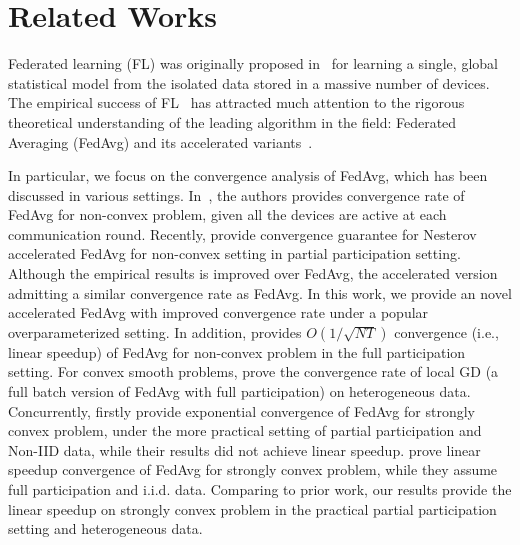 
\section{Related Works}

Federated learning (FL) was originally proposed
in~\cite{mcmahan2016communication} for learning a single, global statistical
model from the isolated data stored in a massive number of devices.  The
empirical success of FL~\cite{chen2018federated,47586} has attracted much attention to the rigorous theoretical understanding of the leading algorithm in the field: Federated Averaging (FedAvg) and its accelerated variants~\cite{liu2019accelerating,haddadpour2019convergence,khaled2019first,li2019convergence,huo2020faster,yu2019linear,yu2019parallel}.

In particular, we focus on the convergence analysis of FedAvg, which
has been discussed in various settings. 
In~\cite{yu2019parallel,wang2019adaptive}, the authors provides convergence
rate of FedAvg for non-convex problem, given all the devices are active at
each communication round. Recently, \citep{huo2020faster} provide 
convergence guarantee for Nesterov accelerated FedAvg for non-convex 
setting in partial participation setting. Although the empirical
results is improved over FedAvg, the accelerated version admitting a similar 
convergence rate as FedAvg. In this work, we provide an novel accelerated
FedAvg with improved convergence rate under a popular overparameterized 
setting. In addition, \cite{yu2019linear} provides $O(1/\sqrt{NT})$ 
convergence (i.e., linear speedup) of FedAvg for non-convex problem in the full participation setting. 
For convex smooth problems, \cite{khaled2019first} prove the 
convergence rate of local GD (a full batch version of FedAvg with full participation) on heterogeneous data. 
Concurrently, \cite{li2019convergence} firstly provide exponential convergence of FedAvg for strongly convex problem,
under the more practical setting of partial participation and Non-IID data,
while their results did not achieve linear speedup. 
\cite{stich2018local} prove linear speedup convergence of FedAvg for strongly convex problem, while they assume full participation and i.i.d. data.
Comparing to prior work, our results provide the linear speedup on strongly convex problem in the practical partial participation setting and heterogeneous data. 









